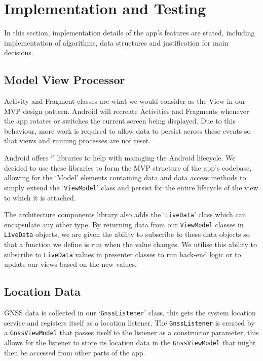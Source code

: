 \section{Implementation and Testing}\label{sec:implementation-and-testing}
In this section, implementation details of the app's features are stated, including implementation of algorithms, data structures and justification for main decisions.


\subsection{Model View Processor}\label{subsec:mvp}
Activity and Fragment classes are what we would consider as the View in our MVP design pattern.
Android will recreate Activities and Fragments whenever the app rotates or switches the current screen being displayed. Due to this behaviour, more work is required to allow data to persist across these events so that views and running processes are not reset.

Android offers `' libraries to help with managing the Android lifecycle.
We decided to use these libraries to form the MVP structure of the app's codebase, allowing for the `Model' elements containing data and data access methods to simply extend the `\texttt{ViewModel}' class and persist for the entire lifecycle of the view to which it is attached.

The architecture components library also adds the `\texttt{LiveData}' class which can encapsulate any other type. By returning data from our \texttt{ViewModel} classes in \texttt{LiveData} objects, we are given the ability to subscribe to these data objects so that a function we define is run when the value changes. We utilise this ability to subscribe to \texttt{LiveData} values in presenter classes to run back-end logic or to update our views based on the new values.

\subsection{Location Data}\label{subsec:location-data}
GNSS data is collected in our `\texttt{GnssListener}' class, this gets the system location service and registers itself as a location listener. The \texttt{GnssListener} is created by a \texttt{GnssViewModel} that passes itself to the listener as a constructor parameter, this allows for the listener to store its location data in the \texttt{GnssViewModel} that might then be accessed from other parts of the app.

